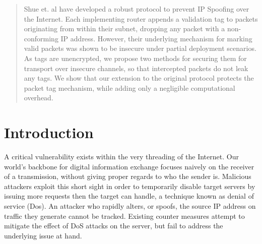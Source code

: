 \documentclass[12pt]{article} %
\begin{document}

\newpage %



\begin{abstract}
	Shue et. al have developed a robust protocol to prevent IP Spoofing over the Internet. Each implementing router appends a validation tag to packets originating from within their subnet, dropping any packet with a non-conforming IP address\cite{Shue20081567}. However, their underlying mechanism for marking valid packets was shown to be insecure under partial deployment scenarios. As tags are unencrypted, we propose two methods for securing them for transport over insecure channels, so that intercepted packets do not leak any tags. We show that our extension to the original protocol protects the packet tag mechanism, while adding only a negligible computational overhead.

\end{abstract}

\section{Introduction}

A critical vulnerability exists within the very threading of the Internet. Our world's backbone for digital information exchange focuses naively on the receiver of a transmission, without giving proper regards to who the sender is. Malicious attackers exploit this short sight in order to temporarily disable target servers by issuing more requests then the target can handle, a technique known as denial of service (Dos). An attacker who rapidly alters, or spoofs, the source IP address on traffic they generate cannot be tracked. Existing counter measures attempt to mitigate the effect of DoS attacks on the server, but fail to address the underlying issue at hand. 
\end{document}
